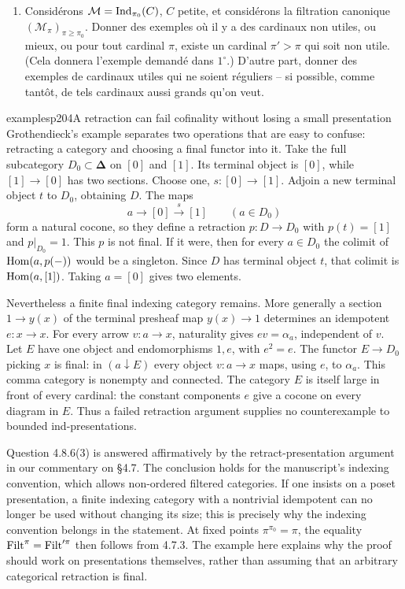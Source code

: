 \begin{enumerate}
\item[4)] Considérons $\mathcal{M}=\operatorname{Ind}_{\pi_0}(C)$, $C$ petite, et considérons la filtration canonique $(\mathcal{M}_\pi)_{\pi\geqslant\pi_0}$. Donner des exemples où il y a des cardinaux non utiles, ou mieux, ou pour tout cardinal $\pi$, existe un cardinal $\pi'>\pi$ qui soit non utile. (Cela donnera l'exemple demandé dans $1^\circ$.) D'autre part, donner des exemples de cardinaux utiles qui ne soient réguliers -- si possible, comme tantôt, de tels cardinaux aussi grands qu'on veut.
\end{enumerate}

\begin{dcomment}{examples}{p204}{A retraction can fail cofinality without losing a small presentation}
Grothendieck's example separates two operations that are easy to confuse: retracting a category and choosing a final functor into it. Take the full subcategory $D_0\subset\boldsymbol\Delta$ on $[0]$ and $[1]$. Its terminal object is $[0]$, while $[1]\to[0]$ has two sections. Choose one, $s:[0]\to[1]$. Adjoin a new terminal object $t$ to $D_0$, obtaining $D$. The maps
\[
 a\longrightarrow[0]\xrightarrow{s}[1]
 \qquad(a\in D_0)
\]
form a natural cocone, so they define a retraction $p:D\to D_0$ with $p(t)=[1]$ and $p|_{D_0}=1$. This $p$ is not final. If it were, then for every $a\in D_0$ the colimit of $\operatorname{Hom}(a,p(-))$ would be a singleton. Since $D$ has terminal object $t$, that colimit is $\operatorname{Hom}(a,[1])$. Taking $a=[0]$ gives two elements.

Nevertheless a finite final indexing category remains. More generally a section $1\to y(x)$ of the terminal presheaf map $y(x)\to1$ determines an idempotent $e:x\to x$. For every arrow $v:a\to x$, naturality gives $ev=\alpha_a$, independent of $v$. Let $E$ have one object and endomorphisms $1,e$, with $e^2=e$. The functor $E\to D_0$ picking $x$ is final: in $(a\downarrow E)$ every object $v:a\to x$ maps, using $e$, to $\alpha_a$. This comma category is nonempty and connected. The category $E$ is itself large in front of every cardinal: the constant components $e$ give a cocone on every diagram in $E$. Thus a failed retraction argument supplies no counterexample to bounded ind-presentations.

Question 4.8.6(3) is answered affirmatively by the retract-presentation argument in our commentary on \S4.7. The conclusion holds for the manuscript's indexing convention, which allows non-ordered filtered categories. If one insists on a poset presentation, a finite indexing category with a nontrivial idempotent can no longer be used without changing its size; this is precisely why the indexing convention belongs in the statement. At fixed points $\pi^{\pi_0}=\pi$, the equality $\operatorname{Filt}^\pi=\operatorname{Filt}'^\pi$ then follows from 4.7.3. The example here explains why the proof should work on presentations themselves, rather than assuming that an arbitrary categorical retraction is final.
\end{dcomment}


